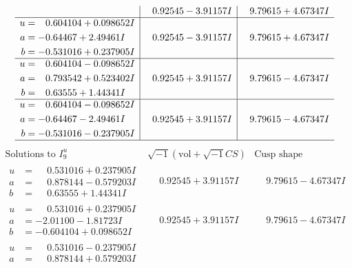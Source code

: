 \documentclass[1p]{elsarticle_modified}
\theoremstyle{definition}
\newcommand{\I}{\sqrt{-1}}
\begin{document}
$$\begin{array}{c|c|c}
 & \phantom{-}0.92545 - 3.91157 I & \phantom{-}9.79615 + 4.67347 I \\ \hline\begin{aligned}
u &= \phantom{-}0.604104 + 0.098652 I \\
a &= -0.64467 + 2.49461 I \\
b &= -0.531016 + 0.237905 I\end{aligned}
 & \phantom{-}0.92545 - 3.91157 I & \phantom{-}9.79615 + 4.67347 I \\ \hline\begin{aligned}
u &= \phantom{-}0.604104 - 0.098652 I \\
a &= \phantom{-}0.793542 + 0.523402 I \\
b &= \phantom{-}0.63555 + 1.44341 I\end{aligned}
 & \phantom{-}0.92545 + 3.91157 I & \phantom{-}9.79615 - 4.67347 I \\ \hline\begin{aligned}
u &= \phantom{-}0.604104 - 0.098652 I \\
a &= -0.64467 - 2.49461 I \\
b &= -0.531016 - 0.237905 I\end{aligned}
 & \phantom{-}0.92545 + 3.91157 I & \phantom{-}9.79615 - 4.67347 I\\
 \hline 
 \end{array}$$\newpage$$\begin{array}{c|c|c}  
\text{Solutions to }I^u_{9}& \I (\text{vol} + \sqrt{-1}CS) & \text{Cusp shape}\\
 \hline 
\begin{aligned}
u &= \phantom{-}0.531016 + 0.237905 I \\
a &= \phantom{-}0.878144 - 0.579203 I \\
b &= \phantom{-}0.63555 + 1.44341 I\end{aligned}
 & \phantom{-}0.92545 + 3.91157 I & \phantom{-}9.79615 - 4.67347 I \\ \hline\begin{aligned}
u &= \phantom{-}0.531016 + 0.237905 I \\
a &= -2.01100 - 1.81723 I \\
b &= -0.604104 + 0.098652 I\end{aligned}
 & \phantom{-}0.92545 + 3.91157 I & \phantom{-}9.79615 - 4.67347 I \\ \hline\begin{aligned}
u &= \phantom{-}0.531016 - 0.237905 I \\
a &= \phantom{-}0.878144 + 0.579203 I \\

\end{aligned}
\end{array}$$
\end{document}
